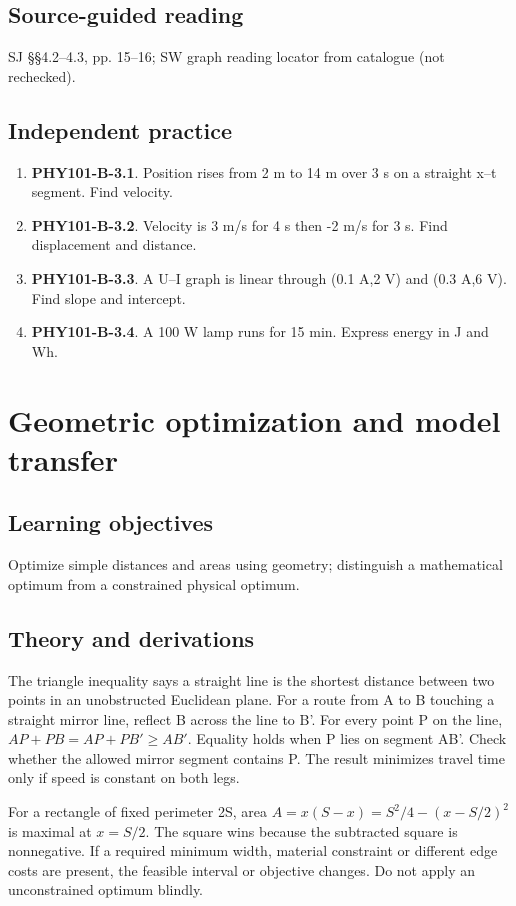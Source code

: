 \documentclass[11pt,a4paper,openany]{book}
\begin{document}
\section{Source-guided reading}
SJ §§4.2–4.3, pp. 15–16; SW graph reading locator from catalogue (not rechecked).
\section{Independent practice}
\begin{enumerate}
\item \textbf{PHY101-B-3.1}. Position rises from 2 m to 14 m over 3 s on a straight x–t segment. Find velocity.
\item \textbf{PHY101-B-3.2}. Velocity is 3 m/s for 4 s then -2 m/s for 3 s. Find displacement and distance.
\item \textbf{PHY101-B-3.3}. A U–I graph is linear through (0.1 A,2 V) and (0.3 A,6 V). Find slope and intercept.
\item \textbf{PHY101-B-3.4}. A 100 W lamp runs for 15 min. Express energy in J and Wh.
\end{enumerate}
\chapter{Geometric optimization and model transfer}
\section{Learning objectives}
Optimize simple distances and areas using geometry; distinguish a mathematical optimum from a constrained physical optimum.
\section{Theory and derivations}
The triangle inequality says a straight line is the shortest distance between two points in an unobstructed Euclidean plane. For a route from A to B touching a straight mirror line, reflect B across the line to B'. For every point P on the line, $AP+PB=AP+PB'\ge AB'$. Equality holds when P lies on segment AB'. Check whether the allowed mirror segment contains P. The result minimizes travel time only if speed is constant on both legs.

For a rectangle of fixed perimeter 2S, area $A=x(S-x)=S^2/4-(x-S/2)^2$ is maximal at $x=S/2$. The square wins because the subtracted square is nonnegative. If a required minimum width, material constraint or different edge costs are present, the feasible interval or objective changes. Do not apply an unconstrained optimum blindly.
\end{document}
